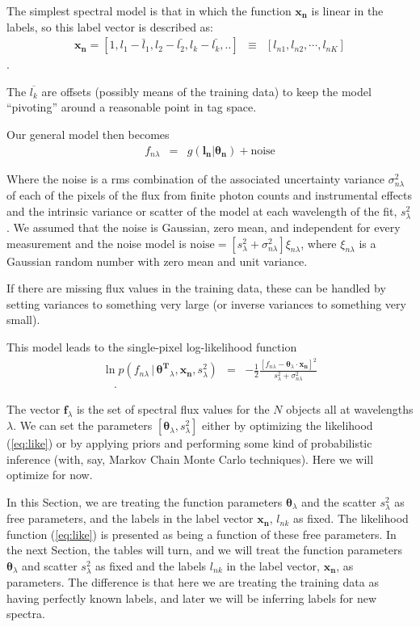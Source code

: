 \documentclass[12pt, preprint]{aastex}
\newcommand{\sectionname}{Section}
\newcommand{\set}[1]{\bm{#1}}
\newcommand{\mean}[1]{\overline{#1}}
\newcommand{\given}{\,|\,}
\begin{document}
The simplest spectral model is that in which the function $\boldsymbol{x_n}$ is
linear in the labels, so this label vector is described as:
\begin{eqnarray}
\set{x_n} =  [1, l_1 - \bar{l}_1, l_2 - \bar{l_2}, l_k - \bar{l_k}, .. ] &\equiv& [l_{n1}, l_{n2}, \cdots, l_{nK}]
\end{eqnarray}.

The $\mean{l_k}$ are offsets (possibly means of the training data) to keep the model ``pivoting'' around a reasonable point in tag space.


Our general model then becomes
\begin{eqnarray}
f_{n\lambda} &=&
g(\boldsymbol{l_n} |  \boldsymbol{\theta_n}) + \mbox{noise}
\label{eq:linear}
\end{eqnarray}

Where the noise is a rms combination of the associated uncertainty variance
$\sigma_{n\lambda}^2$ of each of the pixels of the flux from finite photon counts and instrumental effects and the intrinsic variance or scatter of the model at each wavelength of the fit, $s_\lambda^2$. We assumed that the noise is Gaussian, zero mean, and independent for every measurement and the noise model is $\mbox{noise} = [s_\lambda^2+ \sigma_{n\lambda}^2]\xi_{n\lambda}$, where $\xi_{n\lambda}$ is a Gaussian random number with zero mean and unit
variance.

If there are missing flux values in the training data, these can be
handled by setting variances to something very large (or inverse
variances to something very small).

This model leads to the single-pixel log-likelihood function 
\begin{eqnarray}
\ln p(f_{n\lambda}\given\set{\theta^T}_\lambda, \boldsymbol{x_n}, s_\lambda^2) &=&
 -\frac{1}{2}\frac{[f_{n\lambda} - \set{\theta}_\lambda \cdot \set{x_n}]^2}{s_\lambda^2 + \sigma_{n\lambda}^2}
\label{eq:like}\\
\quad.
\end{eqnarray}


The vector $\set{f}_\lambda$ is the set of spectral flux values for
the $N$ objects all at wavelengths $\lambda$.
We can set the parameters $[\set{\theta}_\lambda,s_\lambda^2]$ either by
optimizing the likelihood (\ref{eq:like}) or by applying priors and
performing some kind of probabilistic inference (with, say, Markov
Chain Monte Carlo techniques).
Here we will optimize for now.

In this \sectionname, we are treating the function parameters
$\set{\theta}_\lambda$ and the scatter $s_\lambda^2$ as free parameters, and the
labels in the label vector $\set{x_n}$, $l_{nk}$ as fixed.
The likelihood function (\ref{eq:like}) is presented as being a
function of these free parameters.
In the next \sectionname, the tables will turn, and we will treat the
function parameters $\set{\theta}_\lambda$ and scatter $s_{\lambda}^2$ as fixed and
the labels $l_{nk}$ in the label vector, $\set{x_n}$, as parameters.
The difference is that here we are treating the training data as
having perfectly known labels, and later we will be inferring labels for
new spectra.
\end{document}
